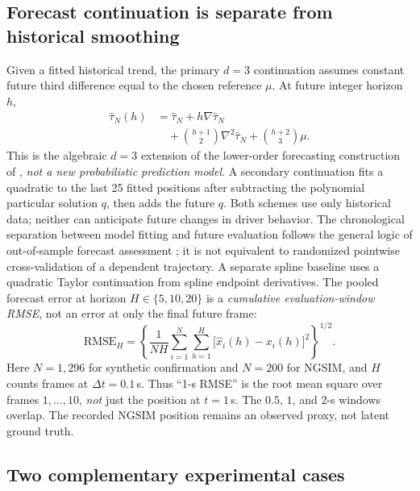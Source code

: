 \subsection{Forecast continuation is separate from historical smoothing}
Given a fitted historical trend, the primary $d=3$
continuation assumes constant future third difference
equal to the chosen reference $\mu$. At future
integer horizon $h$,
\begin{equation}\label{eq:d3-recurrence}
\begin{aligned}
\widehat\tau_N(h)
&=\widehat\tau_N+h\nabla\widehat\tau_N\\
&\quad+\binom{h+1}{2}\nabla^2\widehat\tau_N
+\binom{h+2}{3}\mu.
\end{aligned}
\end{equation}
This is the algebraic $d=3$ extension of the
lower-order forecasting construction of
\citet{guerrero2007}, \emph{not a new
probabilistic prediction model}. A secondary
continuation fits a quadratic to the last 25
fitted positions after subtracting the polynomial
particular solution $q$, then adds the future $q$.
Both schemes use only historical data; neither can
anticipate future changes in driver behavior.
The chronological separation between model fitting and future
evaluation follows the general logic of out-of-sample forecast
assessment \citep{tashman2000,cerqueira2020}; it is not equivalent
to randomized pointwise cross-validation of a dependent trajectory.
A separate spline baseline uses a quadratic Taylor
continuation from spline endpoint derivatives.
The pooled forecast error at horizon $H\in\{5,10,20\}$
is a \emph{cumulative evaluation-window RMSE}, not
an error at only the final future frame:
\begin{equation}\label{eq:forecast-window-rmse}
\mathrm{RMSE}_{H} = \left\{\frac{1}{NH}
\sum_{i=1}^{N}\sum_{h=1}^{H}
\bigl[\widehat x_i(h)-x_i(h)\bigr]^2\right\}^{1/2}.
\end{equation}
Here $N=1{,}296$ for synthetic confirmation and
$N=200$ for NGSIM, and $H$ counts frames at
$\Delta t=0.1$\,s. Thus ``1-s RMSE'' is the
root mean square over frames $1,\ldots,10$,
\emph{not} just the position at $t=1$\,s.
The $0.5$, $1$, and $2$-s windows overlap.
The recorded NGSIM position remains an
observed proxy, not latent ground truth.

\subsection{Two complementary experimental cases}
